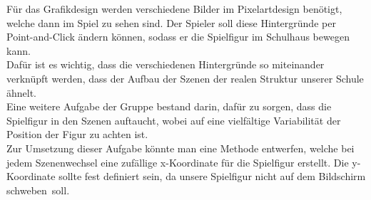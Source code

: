 Für das Grafikdesign werden verschiedene Bilder im Pixelartdesign benötigt, welche dann im Spiel zu sehen sind. Der Spieler soll diese Hintergründe per Point-and-Click ändern können, sodass er die Spielfigur im Schulhaus bewegen kann. \\ Dafür ist es wichtig, dass die verschiedenen Hintergründe so miteinander verknüpft werden, dass der Aufbau der Szenen der realen Struktur unserer Schule ähnelt. \\
Eine weitere Aufgabe der Gruppe bestand darin, dafür zu sorgen, dass die Spielfigur in den Szenen auftaucht, wobei auf eine vielfältige Variabilität der Position der Figur zu achten ist. \\ 
Zur Umsetzung dieser Aufgabe könnte man eine Methode entwerfen, welche bei jedem Szenenwechsel eine zufällige x-Koordinate für die Spielfigur erstellt. Die y-Koordinate sollte fest definiert sein, da unsere Spielfigur nicht auf dem Bildschirm \glqq schweben\grqq\ soll.
